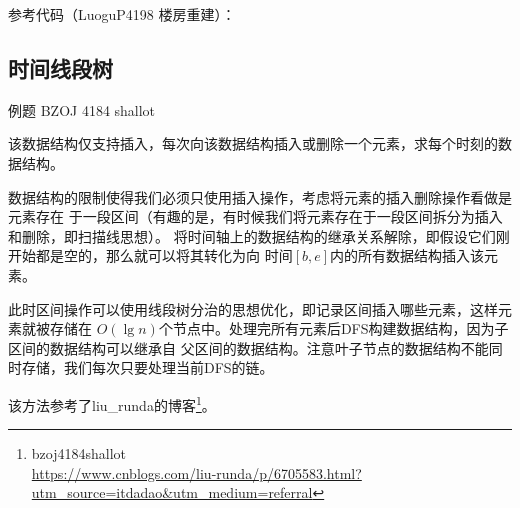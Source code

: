 参考代码（LuoguP4198 楼房重建）：

\subsection{时间线段树}
例题 BZOJ 4184 shallot

该数据结构仅支持插入，每次向该数据结构插入或删除一个元素，求每个时刻的数据结构。

数据结构的限制使得我们必须只使用插入操作，考虑将元素的插入删除操作看做是元素存在
于一段区间（有趣的是，有时候我们将元素存在于一段区间拆分为插入和删除，即扫描线思想）。
将时间轴上的数据结构的继承关系解除，即假设它们刚开始都是空的，那么就可以将其转化为向
时间$[b,e]$内的所有数据结构插入该元素。

此时区间操作可以使用线段树分治的思想优化，即记录区间插入哪些元素，这样元素就被存储在
$O(\lg n)$个节点中。处理完所有元素后DFS构建数据结构，因为子区间的数据结构可以继承自
父区间的数据结构。注意叶子节点的数据结构不能同时存储，我们每次只要处理当前DFS的链。

该方法参考了liu\_runda的博客\footnote{
    bzoj4184shallot\\
    \url{https://www.cnblogs.com/liu-runda/p/6705583.html?utm\_source=itdadao&utm\_medium=referral}
}。
